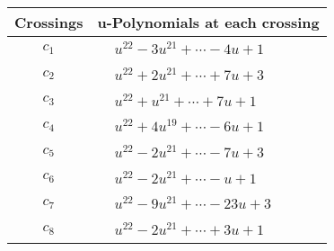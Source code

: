 \documentclass[1p]{elsarticle_modified}
\theoremstyle{definition}
\begin{document}
\begin{tabular}{m{50pt}|m{274pt}}
Crossings & \hspace{64pt}u-Polynomials at each crossing \\
\hline $$\begin{aligned}c_{1}\end{aligned}$$&$\begin{aligned}
&u^{22}-3 u^{21}+\cdots-4 u+1
\end{aligned}$\\
\hline $$\begin{aligned}c_{2}\end{aligned}$$&$\begin{aligned}
&u^{22}+2 u^{21}+\cdots+7 u+3
\end{aligned}$\\
\hline $$\begin{aligned}c_{3}\end{aligned}$$&$\begin{aligned}
&u^{22}+u^{21}+\cdots+7 u+1
\end{aligned}$\\
\hline $$\begin{aligned}c_{4}\end{aligned}$$&$\begin{aligned}
&u^{22}+4 u^{19}+\cdots-6 u+1
\end{aligned}$\\
\hline $$\begin{aligned}c_{5}\end{aligned}$$&$\begin{aligned}
&u^{22}-2 u^{21}+\cdots-7 u+3
\end{aligned}$\\
\hline $$\begin{aligned}c_{6}\end{aligned}$$&$\begin{aligned}
&u^{22}-2 u^{21}+\cdots- u+1
\end{aligned}$\\
\hline $$\begin{aligned}c_{7}\end{aligned}$$&$\begin{aligned}
&u^{22}-9 u^{21}+\cdots-23 u+3
\end{aligned}$\\
\hline $$\begin{aligned}c_{8}\end{aligned}$$&$\begin{aligned}
&u^{22}-2 u^{21}+\cdots+3 u+1
\end{aligned}$\\

\end{tabular}
\end{document}
